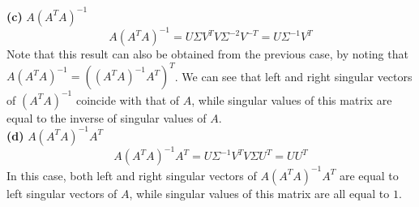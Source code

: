 \documentclass[a4paper,11pt]{article}
\begin{document}

\noindent \textbf{(c)} $A(A^{T}A)^{-1}$
\[A(A^{T}A)^{-1} = U\Sigma V^{T}V\Sigma^{-2}V^{-T}=U\Sigma^{-1}V^{T}\]
Note that this result can also be obtained from the previous case, by noting that $A(A^{T}A)^{-1}=((A^{T}A)^{-1}A^{T})^{T}$. We can see that left and right singular vectors of $(A^{T}A)^{-1}$ coincide with that of $A$, while singular values of this matrix are equal to the inverse of singular values of $A$.\\

\noindent \textbf{(d)} $A(A^{T}A)^{-1}A^{T}$
\[A(A^{T}A)^{-1}A^{T} = U\Sigma^{-1}V^{T}V\Sigma U^{T}= U U^{T} \]
In this case, both left and right singular vectors of $A(A^{T}A)^{-1}A^{T}$ are equal to left singular vectors of $A$, while singular values of this matrix are all equal to $1$.\\
\end{document}
